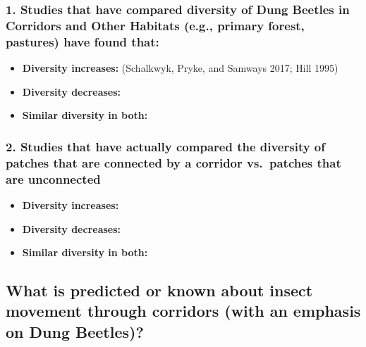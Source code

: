 \documentclass[
  12pt,
]{article}
\begin{document}
\hypertarget{studies-that-have-compared-diversity-of-dung-beetles-in-corridors-and-other-habitats-e.g.-primary-forest-pastures-have-found-that}{%
\subsubsection{1. Studies that have compared diversity of Dung Beetles
in Corridors and Other Habitats (e.g., primary forest, pastures) have
found
that:}\label{studies-that-have-compared-diversity-of-dung-beetles-in-corridors-and-other-habitats-e.g.-primary-forest-pastures-have-found-that}}

\begin{itemize}
\item
  \textbf{Diversity increases:} (Schalkwyk, Pryke, and Samways 2017;
  Hill 1995)
\item
  \textbf{Diversity decreases:}
\item
  \textbf{Similar diversity in both:}
\end{itemize}

\hypertarget{studies-that-have-actually-compared-the-diversity-of-patches-that-are-connected-by-a-corridor-vs.-patches-that-are-unconnected}{%
\subsubsection{2. Studies that have actually compared the diversity of
patches that are connected by a corridor vs.~patches that are
unconnected}\label{studies-that-have-actually-compared-the-diversity-of-patches-that-are-connected-by-a-corridor-vs.-patches-that-are-unconnected}}

\begin{itemize}
\item
  \textbf{Diversity increases:}
\item
  \textbf{Diversity decreases:}
\item
  \textbf{Similar diversity in both:}
\end{itemize}

\hypertarget{what-is-predicted-or-known-about-insect-movement-through-corridors-with-an-emphasis-on-dung-beetles}{%
\subsection{What is predicted or known about insect movement through
corridors (with an emphasis on Dung
Beetles)?}\label{what-is-predicted-or-known-about-insect-movement-through-corridors-with-an-emphasis-on-dung-beetles}}
\end{document}
